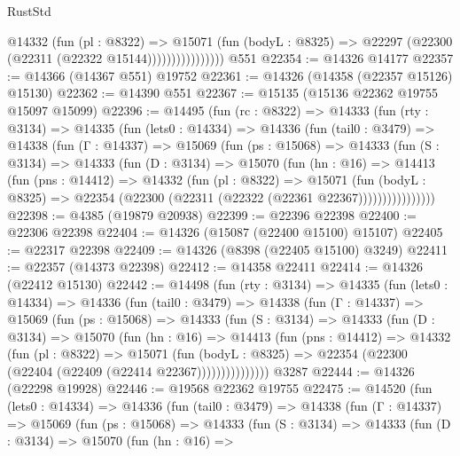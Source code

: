 \begin{lexlean}{RustStd}
\begin{coremodule}
                        @14332
                          (fun (pl : @8322) =>
                          @15071
                            (fun (bodyL : @8325) =>
                            @22297 (@22300 (@22311 (@22322 @15144))))))))))))))))
    @551
@22354 := @14326 @14177
@22357 := @14366 (@14367 @551) @19752
@22361 := @14326 (@14358 (@22357 @15126) @15130)
@22362 := @14390 @551
@22367 := @15135 (@15136 @22362 @19755 @15097 @15099)
@22396 := @14495
    (fun (rc : @8322) =>
    @14333
      (fun (rty : @3134) =>
      @14335
        (fun (lets0 : @14334) =>
        @14336
          (fun (tail0 : @3479) =>
          @14338
            (fun (Γ : @14337) =>
            @15069
              (fun (ps : @15068) =>
              @14333
                (fun (S : @3134) =>
                @14333
                  (fun (D : @3134) =>
                  @15070
                    (fun (hn : @16) =>
                    @14413
                      (fun (pns : @14412) =>
                      @14332
                        (fun (pl : @8322) =>
                        @15071
                          (fun (bodyL : @8325) =>
                          @22354 (@22300 (@22311 (@22322 (@22361 @22367))))))))))))))))
@22398 := @4385 (@19879 @20938)
@22399 := @22396 @22398
@22400 := @22306 @22398
@22404 := @14326 (@15087 (@22400 @15100) @15107)
@22405 := @22317 @22398
@22409 := @14326 (@8398 (@22405 @15100) @3249)
@22411 := @22357 (@14373 @22398)
@22412 := @14358 @22411
@22414 := @14326 (@22412 @15130)
@22442 := @14498
    (fun (rty : @3134) =>
    @14335
      (fun (lets0 : @14334) =>
      @14336
        (fun (tail0 : @3479) =>
        @14338
          (fun (Γ : @14337) =>
          @15069
            (fun (ps : @15068) =>
            @14333
              (fun (S : @3134) =>
              @14333
                (fun (D : @3134) =>
                @15070
                  (fun (hn : @16) =>
                  @14413
                    (fun (pns : @14412) =>
                    @14332
                      (fun (pl : @8322) =>
                      @15071
                        (fun (bodyL : @8325) =>
                        @22354 (@22300 (@22404 (@22409 (@22414 @22367)))))))))))))))
    @3287
@22444 := @14326 (@22298 @19928)
@22446 := @19568 @22362 @19755
@22475 := @14520
    (fun (lets0 : @14334) =>
    @14336
      (fun (tail0 : @3479) =>
      @14338
        (fun (Γ : @14337) =>
        @15069
          (fun (ps : @15068) =>
          @14333
            (fun (S : @3134) =>
            @14333
              (fun (D : @3134) =>
              @15070
                (fun (hn : @16) =>

\end{coremodule}
\end{lexlean}
